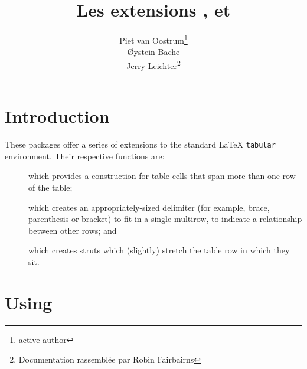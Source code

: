 \documentclass[a4paper]{article}
\begin{document}
\title{Les extensions ,
   et
  }
\author{Piet van Oostrum\thanks{\og active author \fg}\\
  \O{}ystein Bache\\
  Jerry Leichter\thanks{Documentation rassemblée par Robin Fairbairns}}
\date{}
\maketitle

\section{Introduction}
\tradini
These packages offer a series of extensions to the standard \LaTeX{}
\texttt{tabular} environment.  Their respective functions are:
\begin{description}
\item[] which provides a construction for table cells
  that span more than one row of the table;
\item[] which creates an appropriately-sized
  delimiter (for example, brace, parenthesis or bracket) to fit in a
  single multirow, to indicate a relationship between other rows; and
\item[] which creates struts which (slightly) stretch
  the table row in which they sit.
\end{description}

\section{Using }\label{sec:multirow}
\end{document}
